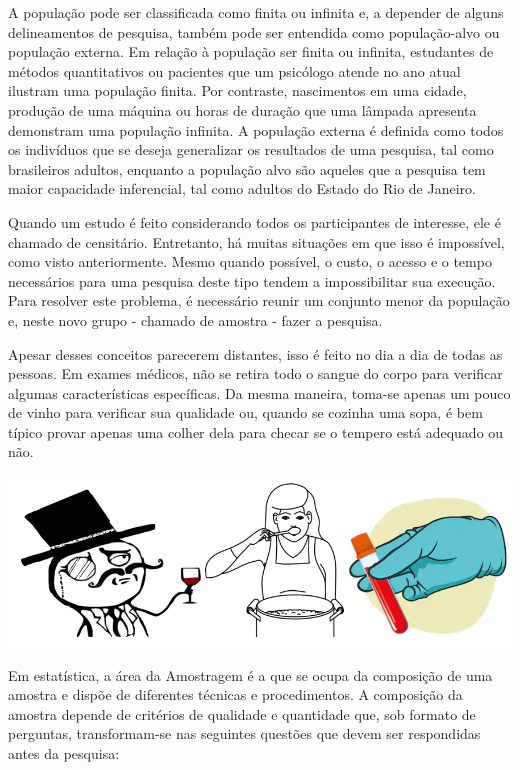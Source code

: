 \documentclass[
]{book}
\begin{document}
A população pode ser classificada como finita ou infinita e, a depender de alguns delineamentos de pesquisa, também pode ser entendida como população-alvo ou população externa. Em relação à população ser finita ou infinita, estudantes de métodos quantitativos ou pacientes que um psicólogo atende no ano atual ilustram uma população finita. Por contraste, nascimentos em uma cidade, produção de uma máquina ou horas de duração que uma lâmpada apresenta demonstram uma população infinita. A população externa é definida como todos os indivíduos que se deseja generalizar os resultados de uma pesquisa, tal como brasileiros adultos, enquanto a população alvo são aqueles que a pesquisa tem maior capacidade inferencial, tal como adultos do Estado do Rio de Janeiro.

Quando um estudo é feito considerando todos os participantes de interesse, ele é chamado de censitário. Entretanto, há muitas situações em que isso é impossível, como visto anteriormente. Mesmo quando possível, o custo, o acesso e o tempo necessários para uma pesquisa deste tipo tendem a impossibilitar sua execução. Para resolver este problema, é necessário reunir um conjunto menor da população e, neste novo grupo - chamado de amostra - fazer a pesquisa.

Apesar desses conceitos parecerem distantes, isso é feito no dia a dia de todas as pessoas. Em exames médicos, não se retira todo o sangue do corpo para verificar algumas características específicas. Da mesma maneira, toma-se apenas um pouco de vinho para verificar sua qualidade ou, quando se cozinha uma sopa, é bem típico provar apenas uma colher dela para checar se o tempero está adequado ou não.

\includegraphics{./img/cap_amostra_desenhos.png}

Em estatística, a área da Amostragem é a que se ocupa da composição de uma amostra e dispõe de diferentes técnicas e procedimentos. A composição da amostra depende de critérios de qualidade e quantidade que, sob formato de perguntas, transformam-se nas seguintes questões que devem ser respondidas antes da pesquisa:
\end{document}
